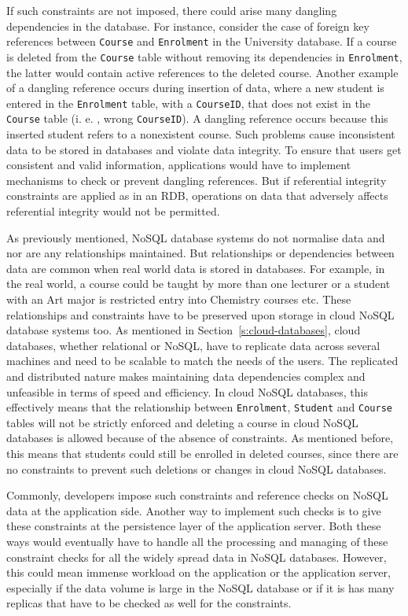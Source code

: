 If such constraints are not imposed,   there could arise many dangling
dependencies in the database.  For instance,   consider the case of foreign key
references between \texttt{Course} and \texttt{Enrolment} in the  University
database.  If a course is deleted from the \texttt{Course} table without removing
its dependencies in \texttt{Enrolment},   the latter would contain active references
to the deleted course.  Another example of a dangling reference occurs during
insertion of data,   where a new student is entered in the
\texttt{Enrolment} table,   with a \texttt{CourseID},   that does not
exist in the \texttt{Course} table (i. e. ,   wrong \texttt{CourseID}).  A dangling
reference occurs because this inserted student refers to a nonexistent course. 
Such problems cause inconsistent data to be stored in databases and violate data
integrity.  To ensure that users get consistent and valid information,  
applications would have to implement mechanisms to check or prevent dangling references.  But if
referential integrity constraints are applied as in an \ac{RDB},   operations
on data that  adversely affects referential integrity   would not be
permitted.

As previously mentioned,   \ac{NoSQL} database systems do not normalise data and
nor are any relationships maintained.  But relationships or dependencies
between data are common when real world data is stored in databases.  For example,   in the
real world,   a course could be taught by more than one lecturer or a student with
an Art major is restricted entry into Chemistry courses etc.  These relationships
and constraints have to be preserved upon storage in
cloud \ac{NoSQL} database systems too.  As mentioned in
Section~\ref{s:cloud-databases},   cloud databases,   whether relational or
\ac{NoSQL},   have to replicate data across several machines and need to be
scalable to match the needs of the users.  The replicated and distributed nature
makes maintaining data dependencies complex and unfeasible in terms of speed and
efficiency.  In cloud \ac{NoSQL} databases,   this effectively means that the
relationship between \texttt{Enrolment}, \texttt{Student} and \texttt{Course}
tables will not be strictly enforced and deleting a course in cloud \ac{NoSQL} databases is allowed because
of the absence of constraints.  As mentioned before,   this means that students
could still be enrolled in deleted courses,   since there are no constraints to
prevent such deletions or changes in cloud \ac{NoSQL} databases. 

Commonly,   developers impose such constraints and reference checks on \ac{NoSQL}
data at the application side.  Another way to implement such checks is to give
these constraints at the persistence layer of the application server.  Both these
ways would eventually have to handle all the processing and managing of these
constraint checks for all the widely spread data in \ac{NoSQL} databases. 
However,   this could mean immense workload on the application or the application
server,   especially if the data volume is large in the \ac{NoSQL} database or if it is
has many replicas that have to be checked as well for the constraints. 


